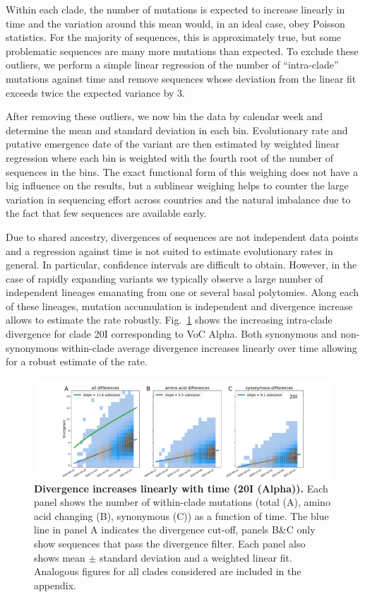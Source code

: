 \documentclass[aps,rmp, twocolumn]{revtex4}
\begin{document}
Within each clade, the number of mutations is expected to increase linearly in time and the variation around this mean would, in an ideal case, obey Poisson statistics.
For the majority of sequences, this is approximately true, but some problematic sequences are many more mutations than expected.
To exclude these outliers, we perform a simple linear regression of the number of ``intra-clade'' mutations against time and remove sequences whose deviation from the linear fit exceeds twice the expected variance by 3.

After removing these outliers, we now bin the data by calendar week and determine the mean and standard deviation in each bin.
Evolutionary rate and putative emergence date of the variant are then estimated by weighted linear regression where each bin is weighted with the fourth root of the number of sequences in the bins.
The exact functional form of this weighing does not have a big influence on the results, but a sublinear weighing helps to counter the large variation in sequencing effort across countries and the natural imbalance due to the fact that few sequences are available early.

Due to shared ancestry, divergences of sequences are not independent data points and a regression against time is not suited to estimate evolutionary rates in general.
In particular, confidence intervals are difficult to obtain.
However, in the case of rapidly expanding variants we typically observe a large number of independent lineages emanating from one or several basal polytomies.
Along each of these lineages, mutation accumulation is independent and divergence increase allows to estimate the rate robustly.
Fig.~\ref{fig:rate_alpha} shows the increasing intra-clade divergence for clade 20I corresponding to VoC Alpha.
Both synonymous and non-synonymous within-clade average divergence increases linearly over time allowing for a robust estimate of the rate.

\begin{figure}[tb]
    \includegraphics[width=\textwidth]{figures/rtt/20I_rtt.pdf}
    \caption{{\bf Divergence increases linearly with time (20I (Alpha)).} Each panel shows the number of within-clade mutations (total (A), amino acid changing (B), synonymous (C)) as a function of time.
    The blue line in panel A indicates the divergence cut-off, panels B\&C only show sequences that pass the divergence filter. Each panel also shows mean $\pm$ standard deviation and a weighted linear fit. Analogous figures for all clades considered are included in the appendix.
    \label{fig:rate_alpha}}
\end{figure}
\end{document}
